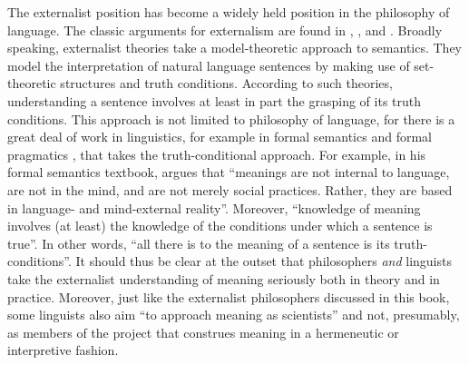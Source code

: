 The externalist position has become a widely held position in the philosophy of language. The classic arguments for externalism are found in \citet{Putnam1975}, \citet{Burge1979,Burge1986}, and \citet{Kripke1980}. Broadly speaking, externalist theories take a model-theoretic approach to semantics. They model the interpretation of natural language sentences by making use of set-theoretic structures and truth conditions. According to such theories, understanding a sentence involves at least in part the grasping of its truth conditions. This approach is not limited to philosophy of language, for there is a great deal of work in linguistics, for example in formal semantics \citep{HeimKratzer1998,Portner2005} and formal pragmatics \citep{Kadmon2001}, that takes the truth-conditional approach. For example, in his formal semantics textbook, \citet[11, 13]{Portner2005} argues that “meanings are not internal to language, are not in the mind, and are not merely social practices. Rather, they are based in language- and mind-external reality”. Moreover, “knowledge of meaning involves (at least) the knowledge of the conditions under which a sentence is true”. In other words, “all there is to the meaning of a sentence is its truth-conditions”. It should thus be clear at the outset that philosophers \textit{and }linguists take the externalist understanding of meaning seriously both in theory and in practice. Moreover, just like the externalist philosophers discussed in this book, some linguists also aim “to approach meaning as scientists” \citep[4]{Portner2005} and not, presumably, as members of the project that construes meaning in a hermeneutic or interpretive fashion. 

